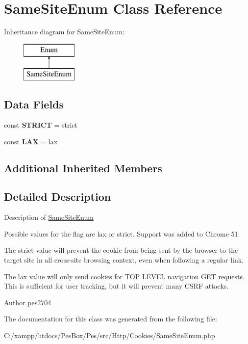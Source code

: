 \hypertarget{class_pes_1_1_http_1_1_cookies_1_1_same_site_enum}{}\section{Same\+Site\+Enum Class Reference}
\label{class_pes_1_1_http_1_1_cookies_1_1_same_site_enum}
Inheritance diagram for Same\+Site\+Enum\+:\begin{figure}[H]
\begin{center}
\leavevmode
\includegraphics[height=2.000000cm]{class_pes_1_1_http_1_1_cookies_1_1_same_site_enum}
\end{center}
\end{figure}
\subsection*{Data Fields}
\begin{DoxyCompactItemize}
\item 
\mbox{\label{class_pes_1_1_http_1_1_cookies_1_1_same_site_enum_a824c9148f2e4e2b8ee362a7876bd74cf}} 
const {\bfseries S\+T\+R\+I\+CT} = \textquotesingle{}strict\textquotesingle{}
\item 
\mbox{\label{class_pes_1_1_http_1_1_cookies_1_1_same_site_enum_ac420e1c589683070703ed794a36284ca}} 
const {\bfseries L\+AX} = \textquotesingle{}lax\textquotesingle{}
\end{DoxyCompactItemize}
\subsection*{Additional Inherited Members}


\subsection{Detailed Description}
Description of \mbox{\hyperlink{class_pes_1_1_http_1_1_cookies_1_1_same_site_enum}{Same\+Site\+Enum}}

Possible values for the flag are lax or strict. Support was added to Chrome 51.
\begin{DoxyItemize}
\item The strict value will prevent the cookie from being sent by the browser to the target site in all cross-\/site browsing context, even when following a regular link.
\item The lax value will only send cookies for T\+OP L\+E\+V\+EL navigation G\+ET requests. This is sufficient for user tracking, but it will prevent many C\+S\+RF attacks.
\end{DoxyItemize}

\begin{DoxyAuthor}{Author}
pes2704 
\end{DoxyAuthor}


The documentation for this class was generated from the following file\+:\begin{DoxyCompactItemize}
\item 
C\+:/xampp/htdocs/\+Pes\+Box/\+Pes/src/\+Http/\+Cookies/Same\+Site\+Enum.\+php\end{DoxyCompactItemize}
